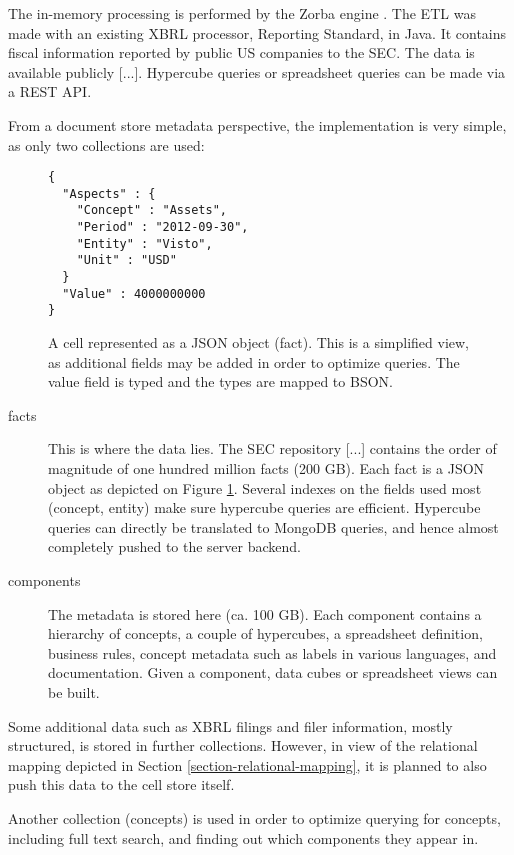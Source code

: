 \documentclass{acm_proc_article-sp}
\begin{document}
The in-memory processing is performed by the Zorba engine \cite{Zorba}. The ETL was made with an existing XBRL processor, Reporting Standard, in Java. It contains fiscal information reported by public US companies to the SEC. The data is available publicly [...]. Hypercube queries or spreadsheet queries can be made via a REST API.

From a document store metadata perspective, the implementation is very simple, as only two collections are used:


\begin{figure}
\begin{lstlisting}
{
  "Aspects" : {
    "Concept" : "Assets",
    "Period" : "2012-09-30",
    "Entity" : "Visto",
    "Unit" : "USD"
  }
  "Value" : 4000000000
}
\end{lstlisting}
\caption{A cell represented as a JSON object (fact). This is a simplified view, as additional fields may be added in order to optimize queries. The value field is typed and the types are mapped to BSON.}
\label{fig-fact}
\end{figure}


\begin{description}
\item[facts] This is where the data lies. The SEC repository [...] contains the order of magnitude of one hundred million facts (200 GB). Each fact is a JSON object as depicted on Figure \ref{fig-fact}. Several indexes on the fields used most (concept, entity) make sure hypercube queries are efficient. Hypercube queries can directly be translated to MongoDB queries, and hence almost completely pushed to the server backend.
\item[components] The metadata is stored here (ca. 100 GB). Each component contains a hierarchy of concepts, a couple of hypercubes, a spreadsheet definition, business rules, concept metadata such as labels in various languages, and documentation. Given a component, data cubes or spreadsheet views can be built.
\end{description}

Some additional data such as XBRL filings and filer information, mostly structured, is stored in further collections. However, in view of the relational mapping depicted in Section \ref{section-relational-mapping}, it is planned to also push this data to the cell store itself.

Another collection (concepts) is used in order to optimize querying for concepts, including full text search, and finding out which components they appear in.
\end{document}
